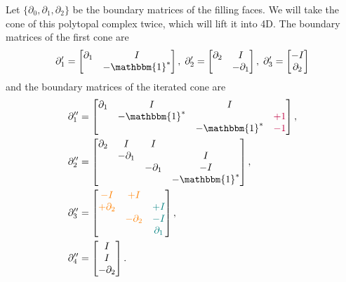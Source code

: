 \documentclass[twocolumn]{article}
\begin{document}
Let $\{\partial_0, \partial_1, \partial_2\}$ be the boundary matrices of the filling faces.
We will take the cone of this polytopal complex twice, which will lift it into 4D.
The boundary matrices of the first cone are
\begin{equation}
    \partial_1' = \left[\begin{matrix}\partial_1 & I \\ & -\mathbbm{1}^*\end{matrix}\right],
    \;\partial_2' = \left[\begin{matrix}\partial_2 & I \\ & -\partial_1\end{matrix}\right],
    \;\partial_3' = \left[\begin{matrix}-I \\ \partial_2\end{matrix}\right]
\end{equation}
and the boundary matrices of the iterated cone are
\begin{align}
    \partial_1'' & = \left[\begin{matrix}\partial_1 & I & I & \\ & -\mathbbm{1}^* & &\textcolor{purple}{+1} \\ & & -\mathbbm{1}^* & \textcolor{purple}{-1}\end{matrix}\right], \label{eq:double-cone-partial1} \\
    \partial_2'' & = \left[\begin{matrix}\partial_2 & I & I & \\ & -\partial_1 & & I \\ & & -\partial_1 & -I \\ & & & -\mathbbm{1}^*\end{matrix}\right],\label{eq:double-cone-partial2} \\
        \partial_3'' & = \left[\begin{matrix}\textcolor{orange}{-I} & \textcolor{orange}{+I} & \\ \textcolor{orange}{+\partial_2} & & \textcolor{teal}{+I} \\ & \textcolor{orange}{-\partial_2} & \textcolor{teal}{-I} \\ & & \textcolor{teal}{\partial_1}\end{matrix}\right],\label{eq:double-cone-partial3} \\
    \partial_4'' & = \left[\begin{matrix} I \\ I \\ -\partial_2\end{matrix}\right].\label{eq:double-cone-partial4}
\end{align}
\end{document}
